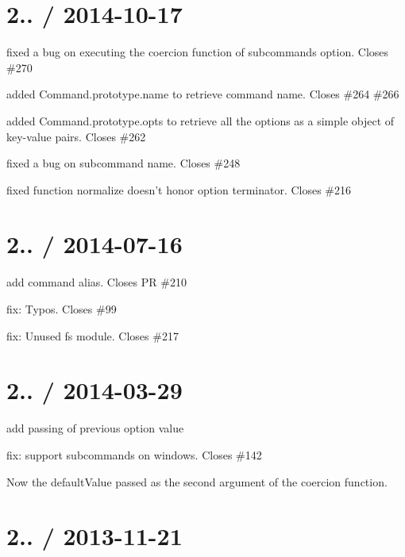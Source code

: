 \section*{2.. / 2014-\/10-\/17 }


\begin{DoxyItemize}
\item fixed a bug on executing the coercion function of subcommands option. Closes \#270
\item added {\ttfamily Command.\+prototype.\+name} to retrieve command name. Closes \#264 \#266 
\item added {\ttfamily Command.\+prototype.\+opts} to retrieve all the options as a simple object of key-\/value pairs. Closes \#262 
\item fixed a bug on subcommand name. Closes \#248 
\item fixed function normalize doesn’t honor option terminator. Closes \#216 
\end{DoxyItemize}

\section*{2.. / 2014-\/07-\/16 }


\begin{DoxyItemize}
\item add command alias\textquotesingle{}. Closes PR \#210
\item fix\+: Typos. Closes \#99
\item fix\+: Unused fs module. Closes \#217
\end{DoxyItemize}

\section*{2.. / 2014-\/03-\/29 }


\begin{DoxyItemize}
\item add passing of previous option value
\item fix\+: support subcommands on windows. Closes \#142
\item Now the default\+Value passed as the second argument of the coercion function.
\end{DoxyItemize}

\section*{2.. / 2013-\/11-\/21 }


